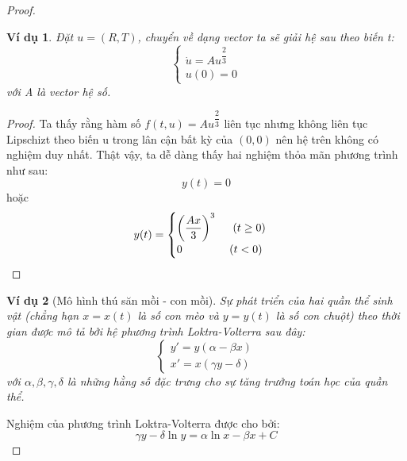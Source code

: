 \documentclass[a4paper]{article}
\newtheorem{example}{Ví dụ}
\begin{document}
\begin{proof}
\begin{example}
    Đặt $u = (R, T)$, chuyển về dạng vector ta sẽ giải hệ sau theo biến t:
    $$\begin{cases}
        \dot{u} = Au^{\dfrac{2}{3}} \\
        u(0) = 0
    \end{cases}$$
    với A là vector hệ số.
\end{example}
\begin{proof}
    Ta thấy rằng hàm số $f(t, u) = Au^{\dfrac{2}{3}}$ liên tục nhưng không liên tục Lipschizt theo biến u trong lân cận bất kỳ của $(0,0)$ nên hệ trên không có nghiệm duy nhất. Thật vậy, ta dễ dàng thấy hai nghiệm thỏa mãn phương trình như sau: 
    $$ y(t) = 0$$
    hoặc 
    $$y(t) = \begin{cases}
        \left(\dfrac{Ax}{3} \right)^3 \hspace{0.5cm} (t \geq 0) \\
        0 \hspace{1.5cm} (t < 0)
    \end{cases}$$
    
\end{proof}

\begin{example}[Mô hình thú săn mồi - con mồi]
    Sự phát triển của hai quần thể sinh vật (chẳng hạn $x=x(t)$ là số con mèo và $y = y(t)$ là số con chuột) theo thời gian được mô tả bởi hệ phương trình Loktra-Volterra sau đây: 
    $$\begin{cases}
        y' = y(\alpha - \beta x) \\
        x' = x(\gamma y - \delta)
    \end{cases}$$
    với $\alpha, \beta, \gamma, \delta$ là những hằng số đặc trưng cho sự tăng trưởng toán học của quần thể.
\end{example}
Nghiệm của phương trình Loktra-Volterra được cho bởi: 
$$\gamma y - \delta \ln{y} = \alpha \ln{x} - \beta x + C$$


\end{proof}
\end{document}
